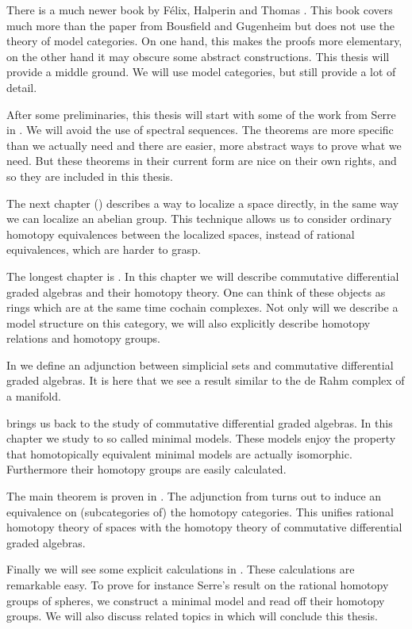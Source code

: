 There is a much newer book by Félix, Halperin and Thomas \cite{felix}. This book covers much more than the paper from Bousfield and Gugenheim but does not use the theory of model categories. On one hand, this makes the proofs more elementary, on the other hand it may obscure some abstract constructions. This thesis will provide a middle ground. We will use model categories, but still provide a lot of detail.

After some preliminaries, this thesis will start with some of the work from Serre in . We will avoid the use of spectral sequences. The theorems are more specific than we actually need and there are easier, more abstract ways to prove what we need. But these theorems in their current form are nice on their own rights, and so they are included in this thesis.

The next chapter () describes a way to localize a space directly, in the same way we can localize an abelian group. This technique allows us to consider ordinary homotopy equivalences between the localized spaces, instead of rational equivalences, which are harder to grasp.

The longest chapter is . In this chapter we will describe commutative differential graded algebras and their homotopy theory. One can think of these objects as rings which are at the same time cochain complexes. Not only will we describe a model structure on this category, we will also explicitly describe homotopy relations and homotopy groups.

In  we define an adjunction between simplicial sets and commutative differential graded algebras. It is here that we see a result similar to the de Rahm complex of a manifold.

 brings us back to the study of commutative differential graded algebras. In this chapter we study to so called minimal models. These models enjoy the property that homotopically equivalent minimal models are actually isomorphic. Furthermore their homotopy groups are easily calculated.

The main theorem is proven in . The adjunction from  turns out to induce an equivalence on (subcategories of) the homotopy categories. This unifies rational homotopy theory of spaces with the homotopy theory of commutative differential graded algebras.

Finally we will see some explicit calculations in . These calculations are remarkable easy. To prove for instance Serre's result on the rational homotopy groups of spheres, we construct a minimal model and read off their homotopy groups. We will also discuss related topics in  which will conclude this thesis.


